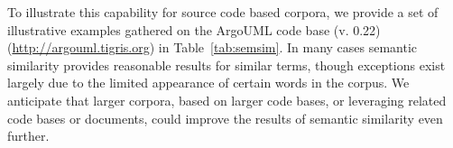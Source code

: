 To illustrate this capability for source code based corpora, we
provide a set of illustrative examples gathered on the ArgoUML code
base (v. 0.22) (\url{http://argouml.tigris.org}) in
Table~\ref{tab:semsim}. In many cases semantic similarity provides
reasonable results for similar terms, though exceptions exist largely
due to the limited appearance of certain words in the corpus.  We
anticipate that larger corpora, based on larger code bases, or
leveraging related code bases or documents, could improve the results
of semantic similarity even further.


